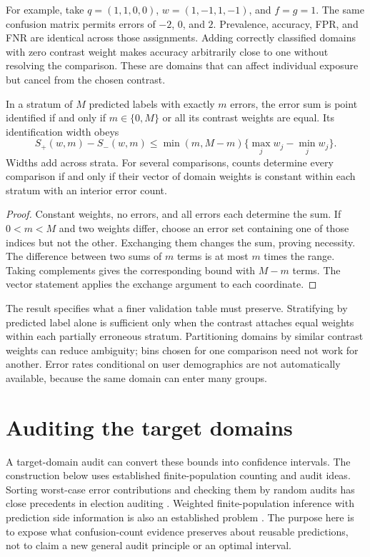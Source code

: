 For example, take $q=(1,1,0,0)$, $w=(1,-1,1,-1)$, and $f=g=1$.
The same confusion matrix permits errors of $-2$, $0$, and $2$.
Prevalence, accuracy, FPR, and FNR are identical across those assignments.
Adding correctly classified domains with zero contrast weight makes accuracy
arbitrarily close to one without resolving the comparison. These are domains
that can affect individual exposure but cancel from the chosen contrast.

\begin{proposition}\label{prop:sufficient}
In a stratum of $M$ predicted labels with exactly $m$ errors, the error sum is
point identified if and only if $m\in\{0,M\}$ or all its contrast weights are
equal. Its identification width obeys
\begin{equation}\label{eq:dispersion}
 S_+(w,m)-S_-(w,m)
 \leq \min(m,M-m)\{\max_jw_j-\min_jw_j\}.
\end{equation}
Widths add across strata. For several comparisons, counts determine every
comparison if and only if their vector of domain weights is constant within
each stratum with an interior error count.
\end{proposition}
\begin{proof}
Constant weights, no errors, and all errors each determine the sum. If
$0<m<M$ and two weights differ, choose an error set containing one of those
indices but not the other. Exchanging them changes the sum, proving necessity.
The difference between two sums of $m$ terms is at most $m$ times the range.
Taking complements gives the corresponding bound with $M-m$ terms. The
vector statement applies the exchange argument to each coordinate.
\end{proof}
The result specifies what a finer validation table must preserve. Stratifying
by predicted label alone is sufficient only when the contrast attaches equal
weights within each partially erroneous stratum. Partitioning domains by
similar contrast weights can reduce ambiguity; bins chosen for one comparison
need not work for another. Error rates conditional on user demographics are
not automatically available, because the same domain can enter many groups.

\section{Auditing the target domains}\label{sec:audit}
A target-domain audit can convert these bounds into confidence intervals.
The construction below uses established finite-population counting and audit
ideas. Sorting worst-case error contributions and checking them by random
audits has close precedents in election auditing \citep{stark2008audits}.
Weighted finite-population inference with prediction side information is also
an established problem \citep{shekhar2023audits}. The purpose here is to expose
what confusion-count evidence preserves about reusable predictions, not to
claim a new general audit principle or an optimal interval.


